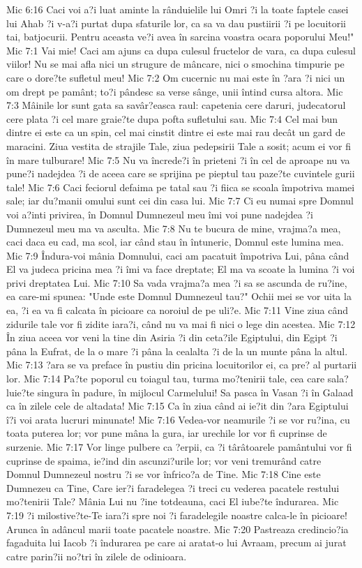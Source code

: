 Mic 6:16  Caci voi a?i luat aminte la rânduielile lui Omri ?i la toate faptele casei lui Ahab ?i v-a?i purtat dupa sfaturile lor, ca sa va dau pustiirii ?i pe locuitorii tai, batjocurii. Pentru aceasta ve?i avea în sarcina voastra ocara poporului Meu!"
Mic 7:1  Vai mie! Caci am ajuns ca dupa culesul fructelor de vara, ca dupa culesul viilor! Nu se mai afla nici un strugure de mâncare, nici o smochina timpurie pe care o dore?te sufletul meu!
Mic 7:2  Om cucernic nu mai este în ?ara ?i nici un om drept pe pamânt; to?i pândesc sa verse sânge, unii întind cursa altora.
Mic 7:3  Mâinile lor sunt gata sa savâr?easca raul: capetenia cere daruri, judecatorul cere plata ?i cel mare graie?te dupa pofta sufletului sau.
Mic 7:4  Cel mai bun dintre ei este ca un spin, cel mai cinstit dintre ei este mai rau decât un gard de maracini. Ziua vestita de strajile Tale, ziua pedepsirii Tale a sosit; acum ei vor fi în mare tulburare!
Mic 7:5  Nu va încrede?i în prieteni ?i în cel de aproape nu va pune?i nadejdea ?i de aceea care se sprijina pe pieptul tau paze?te cuvintele gurii tale!
Mic 7:6  Caci feciorul defaima pe tatal sau ?i fiica se scoala împotriva mamei sale; iar du?manii omului sunt cei din casa lui.
Mic 7:7  Ci eu numai spre Domnul voi a?inti privirea, în Domnul Dumnezeul meu îmi voi pune nadejdea ?i Dumnezeul meu ma va asculta.
Mic 7:8  Nu te bucura de mine, vrajma?a mea, caci daca eu cad, ma scol, iar când stau în întuneric, Domnul este lumina mea.
Mic 7:9  Îndura-voi mânia Domnului, caci am pacatuit împotriva Lui, pâna când El va judeca pricina mea ?i îmi va face dreptate; El ma va scoate la lumina ?i voi privi dreptatea Lui.
Mic 7:10  Sa vada vrajma?a mea ?i sa se ascunda de ru?ine, ea care-mi spunea: "Unde este Domnul Dumnezeul tau?" Ochii mei se vor uita la ea, ?i ea va fi calcata în picioare ca noroiul de pe uli?e.
Mic 7:11  Vine ziua când zidurile tale vor fi zidite iara?i, când nu va mai fi nici o lege din acestea.
Mic 7:12  În ziua aceea vor veni la tine din Asiria ?i din ceta?ile Egiptului, din Egipt ?i pâna la Eufrat, de la o mare ?i pâna la cealalta ?i de la un munte pâna la altul.
Mic 7:13  ?ara se va preface în pustiu din pricina locuitorilor ei, ca pre? al purtarii lor.
Mic 7:14  Pa?te poporul cu toiagul tau, turma mo?tenirii tale, cea care sala?luie?te singura în padure, în mijlocul Carmelului! Sa pasca în Vasan ?i în Galaad ca în zilele cele de altadata!
Mic 7:15  Ca în ziua când ai ie?it din ?ara Egiptului î?i voi arata lucruri minunate!
Mic 7:16  Vedea-vor neamurile ?i se vor ru?ina, cu toata puterea lor; vor pune mâna la gura, iar urechile lor vor fi cuprinse de surzenie.
Mic 7:17  Vor linge pulbere ca ?erpii, ca ?i târâtoarele pamântului vor fi cuprinse de spaima, ie?ind din ascunzi?urile lor; vor veni tremurând catre Domnul Dumnezeul nostru ?i se vor înfrico?a de Tine.
Mic 7:18  Cine este Dumnezeu ca Tine, Care ier?i faradelegea ?i treci cu vederea pacatele restului mo?tenirii Tale? Mânia Lui nu ?ine totdeauna, caci El iube?te îndurarea.
Mic 7:19  ?i milostive?te-Te iara?i spre noi ?i faradelegile noastre calca-le în picioare! Arunca în adâncul marii toate pacatele noastre.
Mic 7:20  Pastreaza credincio?ia fagaduita lui Iacob ?i îndurarea pe care ai aratat-o lui Avraam, precum ai jurat catre parin?ii no?tri în zilele de odinioara.


